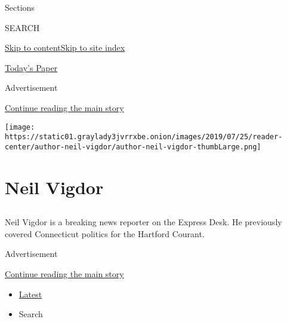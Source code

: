 Sections

SEARCH

\protect\hyperlink{site-content}{Skip to
content}\protect\hyperlink{site-index}{Skip to site index}

\href{https://myaccount.nytimes3xbfgragh.onion/auth/login?response_type=cookie\&client_id=vi}{}

\href{https://www.nytimes3xbfgragh.onion/section/todayspaper}{Today's
Paper}

Advertisement

\protect\hyperlink{after-top}{Continue reading the main story}

\texttt{[image: https://static01.graylady3jvrrxbe.onion/images/2019/07/25/reader-center/author-neil-vigdor/author-neil-vigdor-thumbLarge.png]}

\hypertarget{neil-vigdor}{%
\section{Neil Vigdor}\label{neil-vigdor}}

\subsection{}

Neil Vigdor is a breaking news reporter on the Express Desk. He
previously covered Connecticut politics for the Hartford Courant.

Advertisement

\protect\hyperlink{after-mid1}{Continue reading the main story}

\begin{itemize}
\tightlist
\item
  \protect\hyperlink{stream-panel}{Latest}
\item
  Search
\end{itemize}

